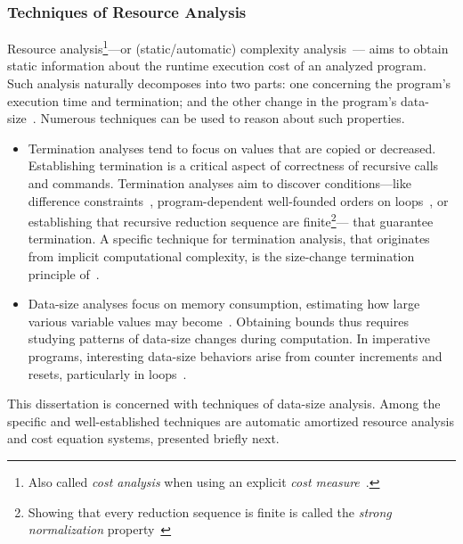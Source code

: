 \subsubsection{Techniques of Resource Analysis}\label{resource-analysis}

Resource analysis\footnote{
Also called \emph{cost analysis} when using an explicit \emph{cost measure}~\cite{albert2008}.
}---or (static/automatic) {complexity analysis}~\cite{rosendahl1989,leivant2013}---%
aims to obtain static information about the runtime {execution cost} of an analyzed program.
Such analysis naturally decomposes into two parts: one concerning the program's execution time and termination;
and the other change in the program's data-size~\cite{jones2009}.
Numerous techniques can be used to reason about such properties.

\begin{itemize}
\item Termination analyses tend to focus on values that are copied or decreased.
      Establishing termination is a critical aspect of correctness of recursive calls and commands.
      Termination analyses aim to discover conditions---like difference constraints~\cite{sinn2017},
      program-dependent well-founded orders on loops~\cite{lee2001}, or
      establishing that recursive reduction sequence are finite\footnote{
      Showing that every reduction sequence is finite is called the \emph{strong normalization} property~\cite[p. 36]{bertot2004}}---
      that guarantee termination.
      A specific technique for termination analysis, that originates from implicit computational complexity, is the size-change termination principle of~\textcite{lee2001}.
\item Data-size analyses focus on memory consumption, estimating how large various variable values may become~\cite{lommen2023}.
      Obtaining bounds thus requires studying patterns of data-size changes during computation.
      In imperative programs, interesting data-size behaviors arise from counter increments and resets, particularly in loops~\cite{sinn2017,benamram2020}.
\end{itemize}

This dissertation is concerned with techniques of data-size analysis.
Among the specific and well-established techniques are automatic amortized resource analysis and cost equation systems, presented briefly next.

